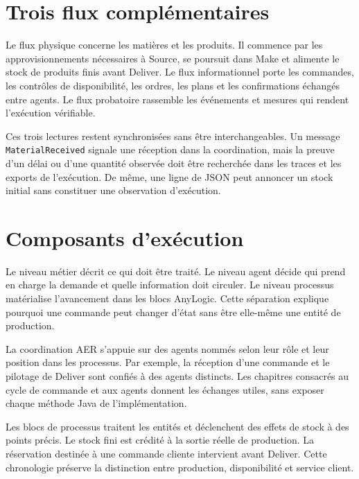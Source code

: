 \section{Trois flux complémentaires}

Le flux physique concerne les matières et les produits. Il commence par les approvisionnements nécessaires à Source, se poursuit dans Make et alimente le stock de produits finis avant Deliver. Le flux informationnel porte les commandes, les contrôles de disponibilité, les ordres, les plans et les confirmations échangés entre agents. Le flux probatoire rassemble les événements et mesures qui rendent l'exécution vérifiable.

Ces trois lectures restent synchronisées sans être interchangeables. Un message \texttt{MaterialReceived} signale une réception dans la coordination, mais la preuve d'un délai ou d'une quantité observée doit être recherchée dans les traces et les exports de l'exécution. De même, une ligne de JSON peut annoncer un stock initial sans constituer une observation d'exécution.



\section{Composants d'exécution}

Le niveau métier décrit ce qui doit être traité. Le niveau agent décide qui prend en charge la demande et quelle information doit circuler. Le niveau processus matérialise l'avancement dans les blocs AnyLogic. Cette séparation explique pourquoi une commande peut changer d'état sans être elle-même une entité de production.

La coordination AER s'appuie sur des agents nommés selon leur rôle et leur position dans les processus. Par exemple, la réception d'une commande et le pilotage de Deliver sont confiés à des agents distincts. Les chapitres consacrés au cycle de commande et aux agents donnent les échanges utiles, sans exposer chaque méthode Java de l'implémentation.

Les blocs de processus traitent les entités et déclenchent des effets de stock à des points précis. Le stock fini est crédité à la sortie réelle de production. La réservation destinée à une commande cliente intervient avant Deliver. Cette chronologie préserve la distinction entre production, disponibilité et service client.

